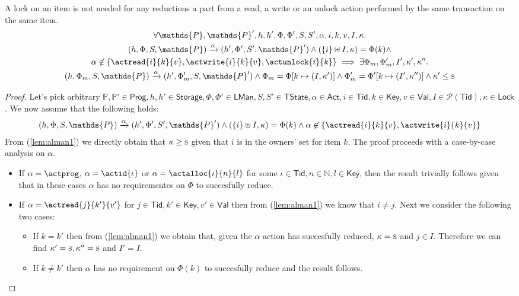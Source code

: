\begin{lem}
	\label{lem:alman} A lock on an item is not needed for any reductions a part from a read, a write or an unlock action performed by the same transaction on the same item.
	\begin{gather*}
		\forall \mathds{P}, \mathds{P}', h, h', \Phi, \Phi', S, S', \alpha, i, k, v, I, \kappa \ldotp \\
		(h, \Phi, S, \mathds{P}) \xrightarrow{\alpha} (h', \Phi', S', \mathds{P}')
			\land
		(\{i\} \uplus I, \kappa) = \Phi(k)
			\land \\
		\alpha \not\in \{ \actread{i}{k}{v}, \actwrite{i}{k}{v}, \actunlock{i}{k} \}
			\implies
		\exists \Phi_m, \Phi_m', I', \kappa', \kappa'' \ldotp \\
		(h, \Phi_m, S, \mathds{P}) \xrightarrow{\alpha} (h', \Phi_m', S, \mathds{P}')
			\land
		\Phi_m = \Phi[k \mapsto (I, \kappa')]
			\land
		\Phi_m' = \Phi'[k \mapsto (I', \kappa'')]
			\land
		\kappa' \leq \textsc{s}
	\end{gather*}
	\begin{proof}
	Let's pick arbitrary $\mathds{P}, \mathds{P}' \in \mathsf{Prog}, h, h' \in \mathsf{Storage}, \Phi, \Phi' \in \mathsf{LMan}, S, S' \in \mathsf{TState}, \alpha \in \mathsf{Act}, i \in \mathsf{Tid}, k \in \mathsf{Key}, v \in \mathsf{Val}, I \in \mathcal{P}(\mathsf{Tid}), \kappa \in \mathsf{Lock}$. We now assume that the following holds:
	\begin{gather}
		\label{lem:alman1}
		(h, \Phi, S, \mathds{P}) \xrightarrow{\alpha} (h', \Phi', S', \mathds{P}')
			\land
		(\{i\} \uplus I, \kappa) = \Phi(k)
			\land
		\alpha \not\in \{ \actread{i}{k}{v}, \actwrite{i}{k}{v} \}
	\end{gather}
	From (\ref{lem:alman1}) we directly obtain that $\kappa \geq \textsc{s}$ given that $i$ is in the owners' set for item $k$. The proof proceeds with a case-by-case analysis on $\alpha$.
	\begin{itemize}
		\item If $\alpha = \actprog$, $\alpha = \actid{\iota}$ or $\alpha = \actalloc{\iota}{n}{l}$ for some $\iota \in \mathsf{Tid}, n \in \mathds{N}, l \in \mathsf{Key}$, then the result trivially follows given that in these cases $\alpha$ has no requirementes on $\Phi$ to succesfully reduce.
		
		\item If $\alpha = \actread{j}{k'}{v'}$ for $j \in \mathsf{Tid}, k' \in \mathsf{Key}, v' \in \mathsf{Val}$ then from (\ref{lem:alman1}) we know that $i \neq j$. Next we consider the following two cases:
			\begin{itemize}
				\item If $k = k'$ then from (\ref{lem:alman1}) we obtain that, given the $\alpha$ action has succesfully reduced, $\kappa = \textsc{s}$ and $j \in I$. Therefore we can find $\kappa' = \textsc{s}, \kappa'' = \textsc{s}$ and $I' = I$.
				\item If $k \neq k'$ then $\alpha$ has no requirement on $\Phi(k)$ to succesfully reduce and the result follows.
			\end{itemize}
			

\end{itemize}
\end{proof}
\end{lem}
